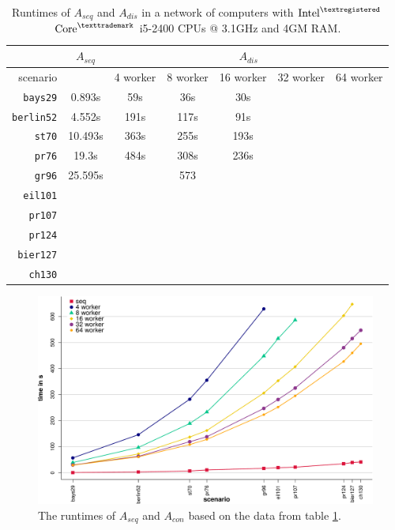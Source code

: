 \begin{table}[h!]
  \centering
  \begin{tabular}{r|c||c|c|c|c|c|}
    \cline{2-7}
    & \multicolumn{1}{c||}{$A_{seq}$} & \multicolumn{5}{c|}{$A_{dis}$} \\
    \hline
    \multicolumn{1}{|r||}{scenario} & & 4 worker & 8 worker & 16 worker & 32 worker & 64 worker \\
    \hline
    \hline
    \multicolumn{1}{|r||}{\texttt{bays29}} & 0.893s & 59s & 36s & 30s & & \\
    \hline
    \multicolumn{1}{|r||}{\texttt{berlin52}} & 4.552s & 191s & 117s & 91s & & \\
    \hline
    \multicolumn{1}{|r||}{\texttt{st70}} & 10.493s & 363s & 255s & 193s & & \\
    \hline
    \multicolumn{1}{|r||}{\texttt{pr76}} & 19.3s & 484s & 308s & 236s & & \\
    \hline
    \multicolumn{1}{|r||}{\texttt{gr96}} & 25.595s & & 573 & & & \\
    \hline
    \multicolumn{1}{|r||}{\texttt{eil101}} & & & & & & \\
    \hline
    \multicolumn{1}{|r||}{\texttt{pr107}} & & & & & & \\
    \hline
    \multicolumn{1}{|r||}{\texttt{pr124}} & & & & & & \\
    \hline
    \multicolumn{1}{|r||}{\texttt{bier127}} & & & & & & \\
    \hline
    \multicolumn{1}{|r||}{\texttt{ch130}} & & & & & & \\
    \hline
  \end{tabular}
  \caption{Runtimes of $A_{seq}$ and $A_{dis}$ in a network of computers with $\text{Intel}^{\textregistered}$ $\text{Core}^{\texttrademark}$ i5-2400 CPUs @ 3.1GHz and 4GM RAM.}
  \vspace*{-0.75em}
  \label{tbl:test2}
\end{table}

\begin{figure}[h!]
  \centering
  \includegraphics[width=\textwidth]{img/test_distributed.pdf}
  \caption{The runtimes of $A_{seq}$ and $A_{con}$ based on the data from table \ref{tbl:test2}.}
  \label{fig:test2}
\end{figure}


